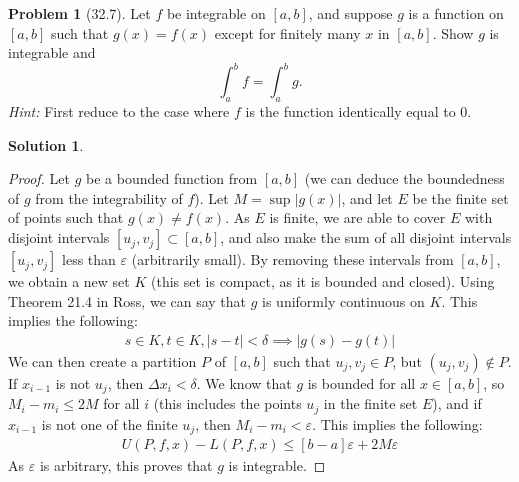 \documentclass[12pt]{article}
\theoremstyle{definition} %
\newtheorem{solution}{Solution}
\newtheorem{problem}{Problem}
\theoremstyle{plain} %
\begin{document}
\begin{problem}[32.7]
    Let $ f $ be integrable on $[a, b]$, and suppose $ g $ is a function on $[a, b]$ such that $ g(x) = f(x) $ except for finitely many $ x $ in $[a, b]$. Show $ g $ is integrable and
$$
\int_a^b f = \int_a^b g.
$$
\textit{Hint:} First reduce to the case where $ f $ is the function identically equal to 0.
\end{problem}
\begin{solution}
    \begin{proof} Let $g$ be a bounded function from $[a,b]$ (we can deduce the boundedness of $g$ from the integrability of $f$). Let $M=\sup\left\vert g(x) \right\vert $, and let $E$ be the finite set of points such that $g(x)\neq f(x)$. As $E$ is finite, we are able to cover $E$ with disjoint intervals $[u_j, v_j]\subset [a,b]$, and also make the sum of all disjoint intervals $[u_j, v_j]$ less than $\varepsilon$ (arbitrarily small). By removing these intervals from $[a,b]$, we obtain a new set $K$ (this set is compact, as it is bounded and closed). Using Theorem 21.4 in Ross, we can say that $g$ is uniformly continuous on $K$. This implies the following: 
        \begin{align}
           s \in K, t \in K, \left\vert s-t \right\vert < \delta \implies  \left\vert g(s)-g(t) \right\vert
        \end{align}
        We can then create a partition $P$ of $[a,b]$ such that $u_j, v_j \in P$, but $(u_j,v_j)\notin P$. If $x_{i-1}$ is not $u_j$, then $\Delta x_i < \delta$. We know that $g$ is bounded for all $x\in [a,b]$, so $M_{i}-m_i \leq 2M $ for all $i$ (this includes the points $u_j$ in the finite set $E$), and if $x_{i-1}$ is not one of the finite $u_j$, then $M_{i}-m_i <\varepsilon$. This implies the following:
        \begin{align}
            U(P,f,x)-L(P,f,x)\leq [b-a]\varepsilon + 2M\varepsilon
        \end{align}   
        As $\varepsilon$ is arbitrary, this proves that $g$ is integrable.  
    \end{proof}
\end{solution}
\end{document}
